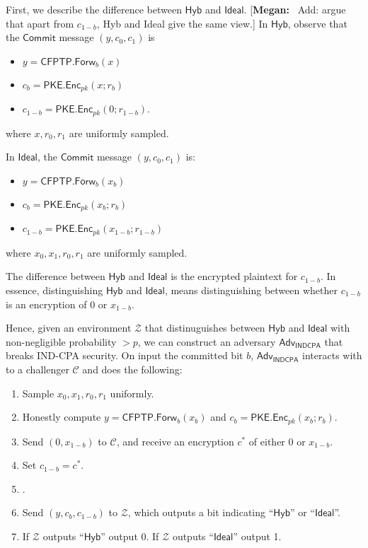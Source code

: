 \documentclass{article}[12pt]
\newcommand{\authnote}[2]{[{\color{red}\textbf{#1:}}~{\color{blue} #2}]}
\newcommand{\authnote}[2]{}
\newcommand{\megan}[1]{\authnote{Megan}{#1}}
\newcommand{\OpenMsg}{\mathsf{Open}}
\newcommand{\CommitMsg}{\mathsf{Commit}}
\newcommand{\PKE}{\mathsf{PKE}}
\newcommand{\Enc}{\mathsf{Enc}}
\newcommand{\Indcpa}{\mathsf{INDCPA}}
\newcommand{\IndcpaGM}{\mathcal{C}} %
\newcommand{\CFPTP}{\mathsf{CFPTP}}
\newcommand{\Forw}{\mathsf{Forw}}
\newcommand{\Adversary}{{\mathsf{Adv}}} %
\newcommand{\Environment}{{\mathcal{Z}}} %
\newcommand{\IndcpaAdversary}{{\Adversary_\Indcpa}}
\newcommand{\Ideal}{{\mathsf{Ideal}}}
\newcommand{\Hyb}{{\mathsf{Hyb}}}
\begin{document}
First, we describe the difference between $\Hyb$ and $\Ideal$. \megan{Add: argue that apart from $c_{1-b}$, Hyb and Ideal give the same view.}
In $\Hyb$, observe that the $\CommitMsg$ message $(y, c_0, c_1)$ is
\begin{itemize}
	\item $y = \CFPTP.\Forw_{b}(x)$
	\item $c_b = \PKE.\Enc_{pk}(x; r_b)$
	\item $c_{1-b} = \PKE.\Enc_{pk}(0; r_{1-b})$.
\end{itemize}
where $x, r_0, r_1$ are uniformly sampled.

In $\Ideal$, the $\CommitMsg$ message $(y, c_0, c_1)$ is:
\begin{itemize}
	\item $y = \CFPTP.\Forw_{b}(x_b)$
	\item $c_b = \PKE.\Enc_{pk}(x_b; r_b)$
	\item $c_{1-b} = \PKE.\Enc_{pk}(x_{1-b}; r_{1-b})$
\end{itemize}
where $x_0, x_1, r_0, r_1$ are uniformly sampled.

The difference between $\Hyb$ and $\Ideal$ is the encrypted plaintext for $c_{1-b}$. In essence, distinguishing $\Hyb$ and $\Ideal$, means distinguishing between whether $c_{1-b}$ is an encryption of $0$ or $x_{1-b}$.

Hence, given an environment $\Environment$ that distinuguishes between $\Hyb$ and $\Ideal$ with non-negligible probability $>p$, we can construct an adversary $\IndcpaAdversary$ that breaks IND-CPA security. On input the committed bit $b$, $\IndcpaAdversary$ interacts with to a challenger $\IndcpaGM$ and does the following:
\begin{enumerate}
	\item Sample $x_0, x_1, r_0, r_1$ uniformly.
	\item Honestly compute $y = \CFPTP.\Forw_b(x_b)$ and $c_b = \PKE.\Enc_{pk}(x_b; r_b)$.
	\item Send $(0, x_{1-b})$ to $\IndcpaGM$, and receive an encryption $c^*$ of either $0$ or $x_{1-b}$.
	\item Set $c_{1-b} = c^*$.
	\item \megan{Generate the rest of $\Environment$'s view (incl. $\OpenMsg$ message)}.
	\item Send $(y, c_b, c_{1-b})$ to $\Environment$, which outputs a bit indicating ``$\Hyb$'' or ``$\Ideal$''.
	\item If $\Environment$ outputs ``$\Hyb$'' output 0. If $\Environment$ outputs ``$\Ideal$'' output 1.
\end{enumerate}
\end{document}
